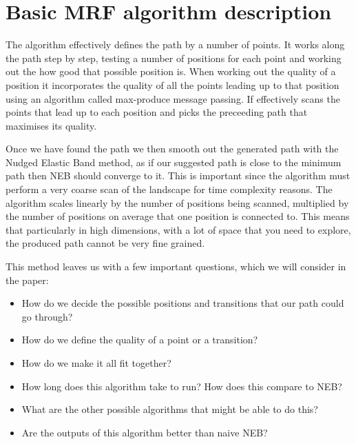 \section{Basic MRF algorithm description}
\label{sec:basic_algo}
The algorithm effectively defines the path by a number of points.
It works along the path step by step, testing a number of positions for each point and working out the how good that possible position is.
When working out the quality of a position it incorporates the quality of all the points leading up to that position using an algorithm called max-produce message passing.
If effectively scans the points that lead up to each position and picks the preceeding path that maximises its quality.

Once we have found the path we then smooth out the generated path with the Nudged Elastic Band method, as if our suggested path is close to the minimum path then NEB should converge to it.
This is important since the algorithm must perform a very coarse scan of the landscape for time complexity reasons.
The algorithm scales linearly by the number of positions being scanned, multiplied by the number of positions on average that one position is connected to.
This means that particularly in high dimensions, with a lot of space that you need to explore, the produced path cannot be very fine grained.

This method leaves us with a few important questions, which we will consider in the paper:
\begin{itemize}
    \item How do we decide the possible positions and transitions that our path could go through?
    \item How do we define the quality of a point or a transition?
    \item How do we make it all fit together?
    \item How long does this algorithm take to run?
    How does this compare to NEB?
    \item What are the other possible algorithms that might be able to do this?
    \item Are the outputs of this algorithm better than naive NEB?
\end{itemize}
